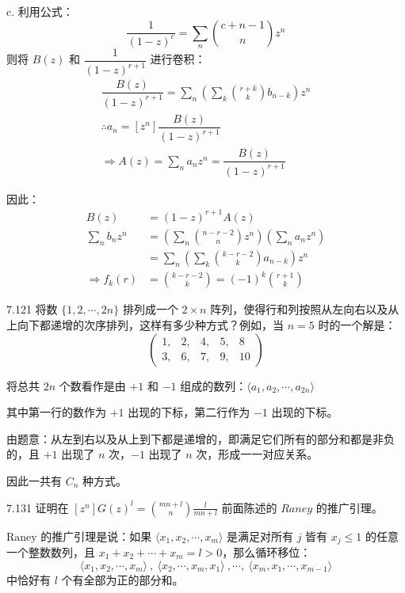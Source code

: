 c.
利用公式：
\[
  \boxed{\dfrac{1}{(1-z)^c} = \sum_n \binom{c+n-1}{n} z^n}
\]
则将 \( B(z) \) 和 \( \dfrac{1}{(1-z)^{r+1}} \) 进行卷积：
\begin{gather*}
  \dfrac{B(z)}{(1-z)^{r+1}} = \sum_n \left( \sum_k \binom{r+k}{k} b_{n-k} \right) z^n \\
  \therefore a_n = [z^n] \dfrac{B(z)}{(1-z)^{r+1}} \\
  \Rightarrow A(z) = \sum_n a_n z^n = \dfrac{B(z)}{(1-z)^{r+1}}
\end{gather*}

因此：
\begin{align*}
  B(z) &= (1-z)^{r+1} A(z) \\
  \sum_n b_n z^n &= \left( \sum_n \binom{n-r-2}{n} z^n \right) \left( \sum_n a_n z^n \right) \\
  &= \sum_n \left(\sum_k \binom{k-r-2}{k} a_{n-k} \right) z^n \\
  \Rightarrow f_k(r) &= \binom{k-r-2}{k} = (-1)^k \binom{r+1}{k}
\end{align*}

\begin{problem}{7.12}{1}
  将数 \( \{ 1, 2, \cdots, 2n \} \) 排列成一个 \( 2 \times n \) 阵列，使得行和列按照从左向右以及从上向下都递增的次序排列，这样有多少种方式？例如，当 \( n=5 \) 时的一个解是：
  \[
    \left(
      \begin{array}{ccccc}
        1, &2, &4, &5, &8 \\
        3, &6, &7, &9, &10
    \end{array} \right)
  \]
\end{problem}

将总共 \( 2n \) 个数看作是由 \( +1 \) 和 \( -1 \) 组成的数列：\( \langle a_1, a_2, \cdots , a_{2n} \rangle \)

其中第一行的数作为 \( +1 \) 出现的下标，第二行作为 \( -1 \) 出现的下标。

由题意：从左到右以及从上到下都是递增的，即满足它们所有的部分和都是非负的，且 \( +1 \) 出现了 \( n \) 次，\( -1 \) 出现了 \( n \) 次，形成一一对应关系。

因此一共有 \( C_n \) 种方式。

\begin{problem}{7.13}{1}
  证明在 \( [z^n] G(z)^l = \displaystyle \binom{mn+l}{n} \frac{l}{mn+l} \) 前面陈述的 \( Raney \) 的推广引理。
\end{problem}

\( \text{Raney} \) 的推广引理是说：如果 \( \langle x_1, x_2, \cdots, x_m \rangle \) 是满足对所有 \( j \) 皆有 \( x_j \leqslant 1 \) 的任意一个整数数列，且 \( x_1 + x_2 + \cdots + x_m = l > 0 \)，那么循环移位：
\[
  \langle x_1, x_2, \cdots, x_m \rangle \ , \ \langle x_2, \cdots, x_m, x_1 \rangle \ , \cdots, \ \langle x_m, x_1, \cdots, x_{m-1} \rangle
\]
中恰好有 \( l \) 个有全部为正的部分和。

